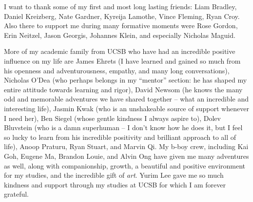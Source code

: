 I want to thank some of my first and most long lasting friends:
%
Liam Bradley, Daniel Kreizberg, Nate Gardner, Kyreija Lamothe, Vince Fleming, Ryan Croy.
%
Also there to support me during many formative moments were Rose Gordon, Erin Neitzel, Jason Georgis, Johannes Klein, and especially Nicholas Maguid.



More of my academic family from UCSB who have had an incredible positive influence on my life are James Ehrets (I have learned and gained so much from his openness and adventurousness, empathy, and many long conversations), Nicholas O'Dea (who perhaps belongs in my ``mentor'' section: he has shaped my entire attitude towards learning and rigor), David Newsom (he knows the many odd and memorable adventures we have shared together -- what an incredible and interesting life), Jasmin Kwak (who is an unshakeable source of support whenever I need her), Ben Siegel (whose gentle kindness I always aspire to), Dolev Bluvstein (who is a damn superhuman -- I don't know how he does it, but I feel so lucky to learn from his incredible positivity and brilliant approach to all of life), Anoop Praturu, Ryan Stuart, and Marvin Qi.
%
My b-boy crew, including Kai Goh, Eugene Ma, Brandon Louie, and Alvin Ong have given me many adventures as well, along with companionship, growth, a beautiful and positive environment for my studies, and the incredible gift of \emph{art}.
%
Yurim Lee gave me so much kindness and support through my studies at UCSB for which I am forever grateful.


